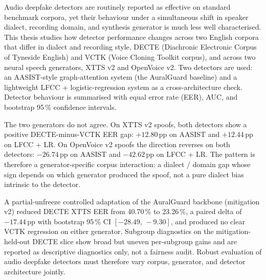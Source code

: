 
\cleardoubleoddpage%
\begin{abstract*}
Audio deepfake detectors are routinely reported as effective on
standard benchmark corpora, yet their behaviour under a
simultaneous shift in speaker dialect, recording domain, and
synthesis generator is much less well characterised. This thesis
studies how detector performance changes across two English
corpora that differ in dialect and recording style, DECTE
(Diachronic Electronic Corpus of Tyneside English) and VCTK
(Voice Cloning Toolkit corpus), and across two neural speech
generators, XTTS v2 and OpenVoice v2. Two detectors are used: an
AASIST-style graph-attention system (the AuralGuard baseline) and
a lightweight LFCC + logistic-regression system as a
cross-architecture check. Detector behaviour is summarised with
equal error rate (EER), AUC, and bootstrap 95\,\% confidence
intervals.

The two generators do not agree. On XTTS v2 spoofs, both
detectors show a positive DECTE-minus-VCTK EER gap:
$+12.80$\,pp on AASIST and $+12.44$\,pp on LFCC + LR. On
OpenVoice v2 spoofs the direction reverses on both detectors:
$-26.74$\,pp on AASIST and $-42.62$\,pp on LFCC + LR. The pattern
is therefore a generator-specific corpus interaction: a
dialect / domain gap whose sign depends on which generator
produced the spoof, not a pure dialect bias intrinsic to the
detector.

A partial-unfreeze controlled adaptation of the AuralGuard
backbone (mitigation v2) reduced DECTE XTTS EER from 40.70\,\%
to 23.26\,\%, a paired delta of $-17.44$\,pp with bootstrap
95\,\% CI $[-28.49,\,-9.30]$, and produced no clear VCTK
regression on either generator. Subgroup diagnostics on the
mitigation-held-out DECTE slice show broad but uneven
per-subgroup gains and are reported as descriptive diagnostics
only, not a fairness audit. Robust evaluation of audio deepfake
detectors must therefore vary corpus, generator, and detector
architecture jointly.
\end{abstract*}




